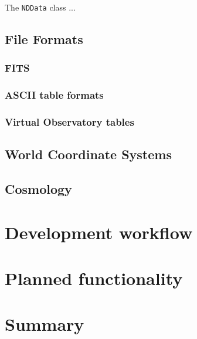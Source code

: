 \documentclass[12pt,preprint]{aastex}
\begin{document}
The \texttt{NDData} class ...

\subsection{File Formats}


\subsubsection{FITS}



\subsubsection{ASCII table formats}



\subsubsection{Virtual Observatory tables}



\subsection{World Coordinate Systems}



\subsection{Cosmology}



\section{Development workflow}




\section{Planned functionality}



\section{Summary}

\end{document}
